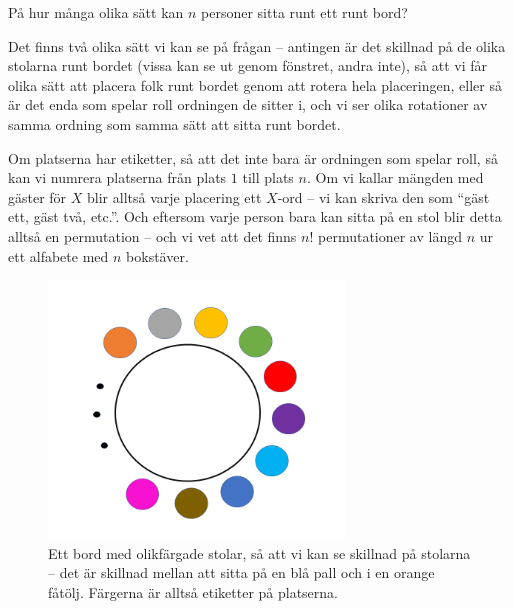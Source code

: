 \documentclass{tufte-handout}
\begin{document}
\begin{example}
	På hur många olika sätt kan $n$ personer sitta runt ett runt bord?

	Det finns två olika sätt vi kan se på frågan -- antingen är det skillnad på de olika stolarna runt bordet (vissa kan se ut genom fönstret, andra inte), så att vi får olika sätt att placera folk runt bordet genom att rotera hela placeringen, eller så är det enda som spelar roll ordningen de sitter i, och vi ser olika rotationer av samma ordning som samma sätt att sitta runt bordet.

	Om platserna har etiketter, så att det inte bara är ordningen som spelar roll, så kan vi numrera platserna från plats $1$ till plats $n$. Om vi kallar mängden med gäster för $X$ blir alltså varje placering ett $X$-ord -- vi kan skriva den som ``gäst ett, gäst två, etc.''. Och eftersom varje person bara kan sitta på en stol blir detta alltså en permutation -- och vi vet att det finns $n!$ permutationer av längd $n$ ur ett alfabete med $n$ bokstäver.
 
	\begin{figure}
		\centering
		\includegraphics[width=0.7\textwidth]{graphics/bordmedfarg1.png}
		\caption{Ett bord med olikfärgade stolar, så att vi kan se skillnad på stolarna -- det är skillnad mellan att sitta på en blå pall och i en orange fåtölj. Färgerna är alltså etiketter på platserna.}
	\end{figure}


\end{example}
\end{document}
